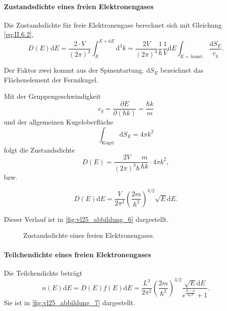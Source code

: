 \paragraph{Zustandsdichte eines freien Elektronengases} 
	Die Zustandsdichte für freie Elektronengase berechnet sich mit Gleichung \eqref{eq:II.6.2},
	\begin{equation}
		\label{eq:II.7.11}
		D(E) \mathrm{d}E = \frac{2 \cdot V}{(2\pi)^3} \int_{E}^{E+\mathrm{d}E} \mathrm{d}^3 k = \frac{2V}{\left( 2\pi \right) ^3}\frac{1}{\hbar} \frac{1}{V} \mathrm{d}E \int_{E=\, \text{konst.}} \frac{\mathrm{d}S_{E}}{v_{\mathrm{g}}}.
	\end{equation}
	\begin{verbal}
		Der Faktor zwei kommt aus der Spinentartung. $\mathrm dS_E$ bezeichnet das Flächenelement der Fermikugel.
	\end{verbal}
	Mit der Gruppengeschwindigkeit
	$$
	v_{g} = \frac{\partial E}{\partial (\hbar k)} = \frac{\hbar k}{m}
	$$ 
	und der allgemeinen Kugeloberfläche
	$$
	\int_{\text{Kugel}} \mathrm{d}S_{E} = 4 \pi k^2
	$$
	folgt die Zustandsdichte
	$$
	D(E) = \frac{2V}{(2\pi)^3 \hbar } \frac{m}{\hbar k} \cdot 4 \pi k^2,
	$$ 
	bzw.
	\setcounter{equation}{12}
	\begin{important}
		\begin{equation}
			\label{eq:II.7.13}
			D(E) \mathrm{d}E = \frac{V}{2\pi^2} \left( \frac{2m}{\hbar ^2} \right)^{3 /2} \sqrt{E} \mathrm{d}E.
		\end{equation}
	\end{important}
	Dieser Verlauf ist in \autoref{fig:vl25_abbildung_6} dargestellt.
	\begin{figure}[H]
		\centering
		\caption{Zustandsdichte eines freien Elektronengases.}
		\label{fig:vl25_abbildung_6}
	\end{figure}

	\paragraph{Teilchendichte eines freien Elektronengases} Die Teilchendichte beträgt
	\begin{equation}
		\label{eq:II.7.14}
		n(E) \mathrm{d}E = D(E) f(E) \mathrm{d}E = \frac{L^3}{2\pi^2} \left( \frac{2m}{\hbar ^2} \right) ^{3 /2} \frac{\sqrt{E} \mathrm{d}E}{e^{ \frac{E-\mu}{k_{\mathrm{B}}T}} + 1}.
	\end{equation}
	Sie ist in \autoref{fig:vl25_abbildung_7} dargestellt.

